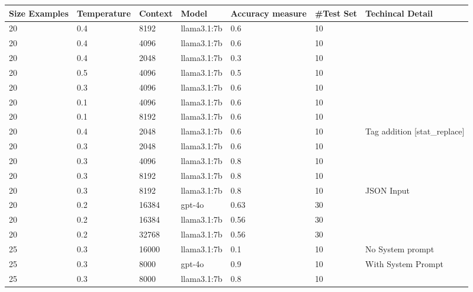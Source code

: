 \begin{table}[!ht]
    \centering
    \small
    \label{tab:result0}
    \begin{tabular}{|p{1.5cm}|p{1.5cm}|p{1.5cm}|p{1.5cm}|p{1.5cm}|p{1.5cm}|p{2cm}|}
        \hline
        \textbf{Size Examples} & \textbf{Temperature} & \textbf{Context} & \textbf{Model} & \textbf{Accuracy measure} & \textbf{\#Test Set} & \textbf{Techincal Detail} \\ \hline
        20 & 0.4 & 8192 & llama3.1:7b & 0.6 & 10 & ~ \\ \hline
        20 & 0.4 & 4096 & llama3.1:7b & 0.6 & 10 & ~ \\ \hline
        20 & 0.4 & 2048 & llama3.1:7b & 0.3 & 10 & ~ \\ \hline
        20 & 0.5 & 4096 & llama3.1:7b & 0.5 & 10 & ~ \\ \hline
        20 & 0.3 & 4096 & llama3.1:7b & 0.6 & 10 & ~ \\ \hline
        20 & 0.1 & 4096 & llama3.1:7b & 0.6 & 10 & ~ \\ \hline
        20 & 0.1 & 8192 & llama3.1:7b & 0.6 & 10 & ~ \\ \hline
        20 & 0.4 & 2048 & llama3.1:7b & 0.6 & 10 & Tag addition [stat\_replace] \\ \hline
        20 & 0.3 & 2048 & llama3.1:7b & 0.6 & 10 & ~ \\ \hline
        20 & 0.3 & 4096 & llama3.1:7b & 0.8 & 10 & ~ \\ \hline
        20 & 0.3 & 8192 & llama3.1:7b & 0.8 & 10 & ~ \\ \hline
        20 & 0.3 & 8192 & llama3.1:7b & 0.8 & 10 & JSON Input \\ \hline
        20 & 0.2 & 16384 & gpt-4o & 0.63 & 30 & ~ \\ \hline
        20 & 0.2 & 16384 & llama3.1:7b & 0.56 & 30 & ~ \\ \hline
        20 & 0.2 & 32768 & llama3.1:7b & 0.56 & 30 & ~ \\ \hline
        25 & 0.3 & 16000 & llama3.1:7b & 0.1 & 10 & No System prompt \\ \hline
        25 & 0.3 & 8000 & gpt-4o & 0.9 & 10 & With System Prompt \\ \hline
        25 & 0.3 & 8000 & llama3.1:7b & 0.8 & 10 & ~ \\ \hline
    \end{tabular}
\end{table}


